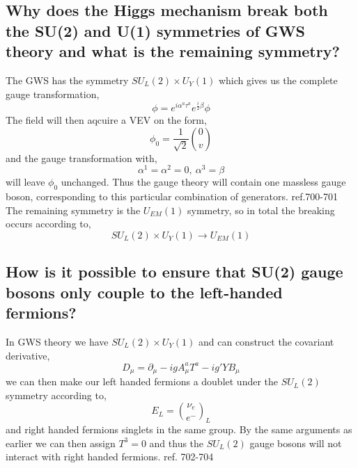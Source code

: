 \documentclass[paper=a4, fontsize=11pt]{scrartcl} %
\numberwithin{equation}{section} %
\numberwithin{figure}{section} %
\numberwithin{table}{section} %
\begin{document}
\subsection*{Why does the Higgs mechanism break both the SU(2) and U(1) symmetries of GWS theory and what is the remaining symmetry?}
The GWS has the symmetry $SU_L(2) \times U_Y(1)$ which gives us the complete gauge transformation,
\begin{equation}
\phi = e^{i\alpha ^a \tau ^a} e^{\frac{i}{2}\beta} \phi
\end{equation}
The field will then aqcuire a VEV on the form,
\begin{equation}
\phi_0 = \frac{1}{\sqrt{2}} {0 \choose v}
\end{equation}
and the gauge transformation with,
\begin{equation}
\alpha ^1 = \alpha ^2 = 0, ~ \alpha ^3 = \beta
\end{equation}
will leave $\phi_0$ unchanged. Thus the gauge theory will contain one massless gauge boson, corresponding to this particular combination of generators.
ref.700-701
The remaining symmetry is the $U_{EM}(1)$ symmetry, so in total the breaking occurs according to,
\begin{equation}
SU_L(2) \times U_Y(1) \rightarrow U_{EM}(1)
\end{equation}
\subsection*{How is it possible to ensure that SU(2) gauge bosons only couple to the left-handed fermions?}
In GWS theory we have $SU_L(2) \times U_Y(1)$ and can construct the covariant derivative, 
\begin{equation}
D_{\mu} = \partial_{\mu} - igA_{\mu}^aT^a-ig'YB_{\mu}
\end{equation}
we can then make our left handed fermions a doublet under the $SU_L(2)$ symmetry according to,
\begin{equation}
E_L = {\nu_e \choose e^-}_L
\end{equation}
and right handed fermions singlets in the same group. By the same arguments as earlier we can then assign $T^3 = 0$ and thus the $SU_L(2)$ gauge bosons will not interact with right handed fermions.
ref. 702-704
\end{document}
